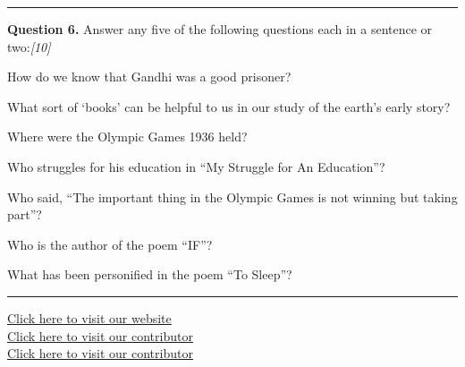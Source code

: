 \documentclass[11pt,a4paper]{article}
\newcommand{\pts}[1]{\hfill   \textit{[#1]}}
\begin{document}
\medskip\rule{\linewidth}{0.2pt}




\noindent   \textbf{Question 6.}
Answer any five of the following questions each in a sentence or two:\pts{10}

\begin{parts}
  \item How do we know that Gandhi was a good prisoner?
  \item What sort of `books' can be helpful to us in our study of the earth's early story?
  \item Where were the Olympic Games 1936 held?
  \item Who struggles for his education in ``My Struggle for An Education''?
  \item Who said, ``The important thing in the Olympic Games is not winning but taking part''?
  \item Who is the author of the poem ``IF''?
  \item What has been personified in the poem ``To Sleep''?
\end{parts}

\vfill
\rule{\linewidth}{0.4pt}

\begin{center}\small
\href{https://bhu-exam.vercel.app/}{Click here to visit our website}\\[4pt]
\href{https://me-aryan.vercel.app/}{Click here to visit our contributor}\\[4pt]
\href{https://quashan-me.vercel.app/}{Click here to visit our contributor}
\end{center}
\end{document}
